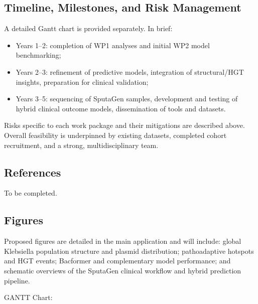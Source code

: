 \subsection*{Timeline, Milestones, and Risk Management}

A detailed Gantt chart is provided separately. In brief:

\begin{itemize}
  \item Years 1–2: completion of WP1 analyses and initial WP2 model benchmarking;
  \item Years 2–3: refinement of predictive models, integration of structural/HGT insights, preparation for clinical validation;
  \item Years 3–5: sequencing of SputaGen samples, development and testing of hybrid clinical outcome models, 
  dissemination of tools and datasets.
\end{itemize}

Risks specific to each work package and their mitigations are described above. 
Overall feasibility is underpinned by existing datasets, completed cohort recruitment, and a strong, multidisciplinary team.

\subsection*{References}

To be completed.

\subsection*{Figures}

Proposed figures are detailed in the main application and will include:
global Klebsiella population structure and plasmid distribution; 
pathoadaptive hotspots and HGT events; 
Bacformer and complementary model performance; 
and schematic overviews of the SputaGen clinical workflow and hybrid prediction pipeline.

GANTT Chart:



